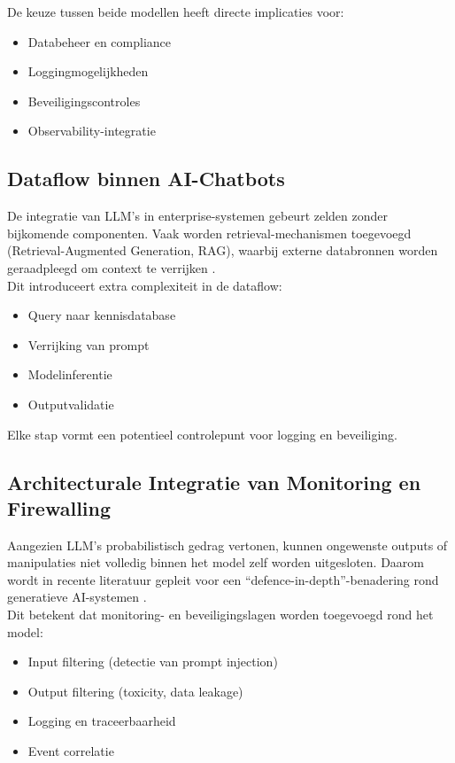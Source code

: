 De keuze tussen beide modellen heeft directe implicaties voor:

\begin{itemize}
    \item Databeheer en compliance
    \item Loggingmogelijkheden
    \item Beveiligingscontroles
    \item Observability-integratie
\end{itemize}

\subsection{Dataflow binnen AI-Chatbots}

De integratie van LLM’s in enterprise-systemen gebeurt zelden zonder bijkomende componenten. Vaak worden retrieval-mechanismen toegevoegd (Retrieval-Augmented Generation, RAG), waarbij externe databronnen worden geraadpleegd om context te verrijken \autocite{lewis2020rag}. \\

Dit introduceert extra complexiteit in de dataflow:

\begin{itemize}
    \item Query naar kennisdatabase
    \item Verrijking van prompt
    \item Modelinferentie
    \item Outputvalidatie
\end{itemize}

Elke stap vormt een potentieel controlepunt voor logging en beveiliging.

\subsection{Architecturale Integratie van Monitoring en Firewalling}

Aangezien LLM’s probabilistisch gedrag vertonen, kunnen ongewenste outputs of manipulaties niet volledig binnen het model zelf worden uitgesloten. Daarom wordt in recente literatuur gepleit voor een ``defence-in-depth''-benadering rond generatieve AI-systemen \autocite{bommasani2021opportunities}.\\

Dit betekent dat monitoring- en beveiligingslagen worden toegevoegd rond het model:

\begin{itemize}
    \item Input filtering (detectie van prompt injection)
    \item Output filtering (toxicity, data leakage)
    \item Logging en traceerbaarheid
    \item Event correlatie
\end{itemize}


